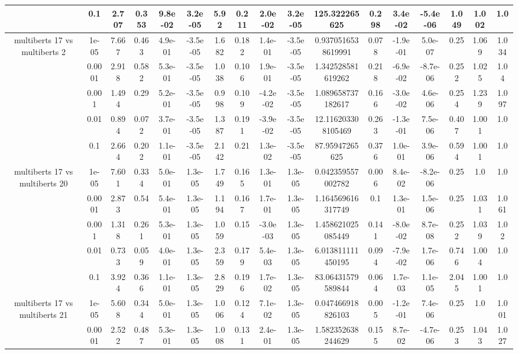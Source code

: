 \begin{tabular}{|c|c|c|c|c|c|c|c|c|c|c|c|c|c|c|c|c|}
 & 0.1 & 2.707 & 0.353 & 9.8e-02 & 3.2e-05 & 5.92 & 0.211 & 2.0e-02 & 3.2e-05 & 125.322265625 & 0.298 & 3.4e-02 & -5.4e-06 & 1.049 & 1.002 & 1.0 \\
\hline
\multirow{5}{*}{multiberts 17 vs multiberts 2} & 1e-05 & 7.667 & 0.463 & 4.9e-01 & -3.5e-05 & 1.682 & 0.182 & 1.4e-01 & -3.5e-05 & 0.9370516538619991 & 0.078 & -1.9e-01 & 5.0e-07 & 0.25 & 1.069 & 1.034 \\
 & 0.0001 & 2.918 & 0.582 & 5.3e-01 & -3.5e-05 & 1.038 & 0.106 & 1.9e-01 & -3.5e-05 & 1.342528581619262 & 0.218 & -6.9e-02 & -8.7e-06 & 0.252 & 1.025 & 1.04 \\
 & 0.001 & 1.494 & 0.29 & 5.2e-01 & -3.5e-05 & 0.998 & 0.109 & -4.2e-02 & -3.5e-05 & 1.089658737182617 & 0.166 & -3.0e-02 & 4.6e-06 & 0.254 & 1.239 & 1.097 \\
 & 0.01 & 0.894 & 0.072 & 3.7e-01 & -3.5e-05 & 1.387 & 0.191 & -3.9e-02 & -3.5e-05 & 12.116203308105469 & 0.263 & -1.3e-01 & 7.5e-06 & 0.407 & 1.001 & 1.0 \\
 & 0.1 & 2.664 & 0.202 & 1.1e-01 & -3.5e-05 & 2.142 & 0.21 & 1.3e-02 & -3.5e-05 & 87.95947265625 & 0.376 & 1.0e-01 & 3.9e-06 & 0.594 & 1.001 & 1.0 \\
\hline
\multirow{5}{*}{multiberts 17 vs multiberts 20} & 1e-05 & 7.601 & 0.334 & 5.0e-01 & 1.3e-05 & 1.749 & 0.165 & 1.3e-01 & 1.3e-05 & 0.042359557002782 & 0.006 & 8.4e-02 & -8.2e-06 & 0.25 & 1.0 & 1.0 \\
 & 0.0001 & 2.873 & 0.54 & 5.4e-01 & 1.3e-05 & 1.194 & 0.167 & 1.7e-01 & 1.3e-05 & 1.164569616317749 & 0.1 & 1.3e-01 & 1.5e-06 & 0.25 & 1.031 & 1.061 \\
 & 0.001 & 1.318 & 0.261 & 5.3e-01 & 1.3e-05 & 1.059 & 0.15 & -3.0e-03 & 1.3e-05 & 1.458621025085449 & 0.141 & -8.0e-02 & 8.7e-08 & 0.252 & 1.039 & 1.02 \\
 & 0.01 & 0.733 & 0.059 & 4.0e-01 & 1.3e-05 & 2.359 & 0.179 & 5.4e-03 & 1.3e-05 & 6.013811111450195 & 0.094 & -7.9e-02 & 1.7e-06 & 0.746 & 1.004 & 1.0 \\
 & 0.1 & 3.924 & 0.366 & 1.1e-01 & 1.3e-05 & 2.829 & 0.196 & 1.7e-02 & 1.3e-05 & 83.06431579589844 & 0.064 & 1.7e-03 & 1.1e-05 & 2.045 & 1.001 & 1.0 \\
\hline
\multirow{5}{*}{multiberts 17 vs multiberts 21} & 1e-05 & 5.608 & 0.344 & 5.0e-01 & 1.3e-05 & 1.006 & 0.124 & 7.1e-02 & 1.3e-05 & 0.047466918826103 & 0.005 & -1.2e-01 & 7.4e-06 & 0.25 & 1.0 & 1.001 \\
 & 0.0001 & 2.522 & 0.487 & 5.3e-01 & 1.3e-05 & 1.008 & 0.131 & 2.4e-01 & 1.3e-05 & 1.582352638244629 & 0.155 & 8.7e-02 & -4.7e-06 & 0.253 & 1.043 & 1.027 \\

\end{tabular}

